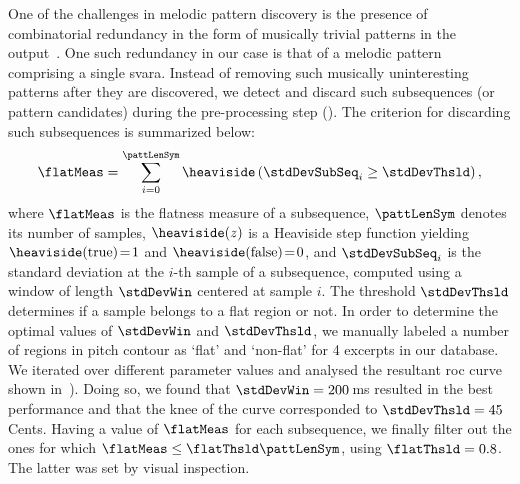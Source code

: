 One of the challenges in melodic pattern discovery is the presence of combinatorial redundancy in the form of musically trivial patterns in the output~\citep{Lartillot2005}. One such redundancy in our case is that of a melodic pattern comprising a single \gls{svara}. Instead of removing such musically uninteresting patterns after they are discovered, we detect and discard such subsequences (or pattern candidates) during the pre-processing step (). The criterion for discarding such subsequences is summarized below:
\begin{equation}
\label{eq:flatness_measure}
\flatMeas =\sum_{i=0}^{\pattLenSym} \heaviside\left(\stdDevSubSeq_i\geq \stdDevThsld\right),
\end{equation}
\noindent where $\flatMeas$ is the flatness measure of a subsequence, $\pattLenSym$ denotes its number of samples, $\heaviside(z)$ is a Heaviside step function yielding $\heaviside(\text{true})\!=\!1$ and $\heaviside(\text{false})\!=\!0$, and $\stdDevSubSeq_i$ is the standard deviation at the $i$-th sample of a subsequence, computed using a window of length $\stdDevWin$ centered at sample $i$. The threshold $\stdDevThsld$ determines if a sample belongs to a flat region or not. In order to determine the optimal values of $\stdDevWin$ and $\stdDevThsld$, we manually labeled a number of regions in pitch contour as `flat' and `non-flat' for 4 excerpts in our database. We iterated over different parameter values and analysed the resultant \acrshort{roc} curve shown in~). %
Doing so, we found that $\stdDevWin=200$\,ms resulted in the best performance and that the knee of the curve corresponded to $\stdDevThsld=45$\,Cents. Having a value of $\flatMeas$ for each subsequence, we finally filter out the ones for which $\flatMeas \leq \flatThsld \pattLenSym$, using $\flatThsld = 0.8$. The latter was set by visual inspection.

